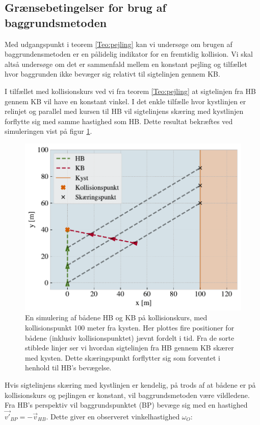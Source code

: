 \documentclass[%
 reprint,
nofootinbib,
aps,
]{revtex4-1}
\begin{document}
 \subsection{Grænsebetingelser for brug af baggrundsmetoden}
 Med udgangspunkt i teorem \ref{Teo:pejling} kan vi undersøge om brugen af baggrundensmetoden er en pålidelig indikator for en fremtidig kollision. Vi skal altså undersøge om det er sammenfald mellem en konstant pejling og tilfællet hvor baggrunden ikke bevæger sig relativt til sigtelinjen gennem KB. \par
 I tilfællet med kollisionskurs ved vi fra teorem \ref{Teo:pejling} at sigtelinjen fra HB gennem KB vil have en konstant vinkel. I det enkle tilfælle hvor kystlinjen er relinjet og parallel med kursen til HB vil sigtelinjens skæring med kystlinjen forflytte sig med samme hastighed som HB. Dette resultat bekræftes ved simuleringen vist på figur \ref{fig:eks1}.
 \begin{figure}[H]
   \includegraphics[width=\linewidth]{figures/eksempel1.pdf}
   \caption{En simulering af bådene HB og KB på kollisionskurs, med kollisionspunkt 100 meter fra kysten. Her plottes fire positioner for bådene (inklusiv kollisionspunktet) jævnt fordelt i tid. Fra de sorte stiblede linjer ser vi hvordan sigtelinjen fra HB gennem KB skærer med kysten. Dette skæringspunkt forflytter sig som forventet i henhold til HB's bevægelse.}
   \label{fig:eks1}
 \end{figure}
 Hvis sigtelinjens skæring med kystlinjen er kendelig, på trods af at bådene er på kollisionskurs og pejlingen er konstant, vil baggrundsmetoden være vildledene. Fra HB's perspektiv vil baggrundspunktet (BP) bevæge sig med en hastighed $\vec{v'}_{BP} = - \vec{v}_{HB}$. Dette giver en observeret vinkelhastighed $\omega_O$:
\end{document}
